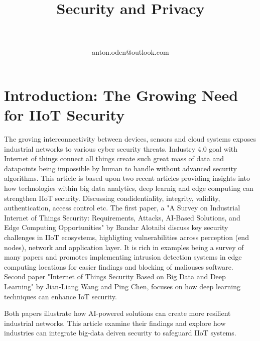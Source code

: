 \documentclass[article,a4paper]{IEEEtran}
\title{Security and Privacy}
\author{
\IEEEauthorblockN{Anton Odén}\\
\IEEEauthorblockA{Dept. of Maths and Computer Science\\Karlstad University\\
651 88 KARLSTAD, Sweden}\\
anton.oden@outlook.com
}
\begin{document}
\maketitle

\begin{abstract}
    
\end{abstract}

\section{Introduction: The Growing Need for IIoT Security}
The groving interconnectivity between devices, sensors and cloud systems exposes industrial networks to various cyber security threats. Industry 4.0 goal with Internet of things connect all things create such great mass of data and datapoints being impossible by human to handle without advanced security algorithms. This article is based upon two recent articles providing insights into how technologies within big data analytics, deep learnig and edge computing can strengthen IIoT security. Discussing condidentiality, integrity, validity, authentication, access control etc.     
\newline\newline
The first paper, a "A Survey on Industrial Internet of Things Security: Requirements, Attacks, AI-Based Solutions, and Edge Computing Opportunities" by Bandar Alotaibi discuss key security challenges in IIoT ecosystems, highligting vulnerabilities across perception (end nodes), network and application layer. It is rich in examples being a survey of many papers and promotes implementing intrusion detection systems in edge computing locations for easier findings and blocking of maliouses software.   
\newline\newline
Second paper "Internet of Things Security Based on Big Data and Deep Learning" by Jian-Liang Wang and Ping Chen, focuses on how deep learning techniques can enhance IoT security. 

Both papers illustrate how AI-powered solutions can create more resilient industrial networks. This article examine their findings and explore how industries can integrate big-data deiven security to safeguard IIoT systems. 
\end{document}
